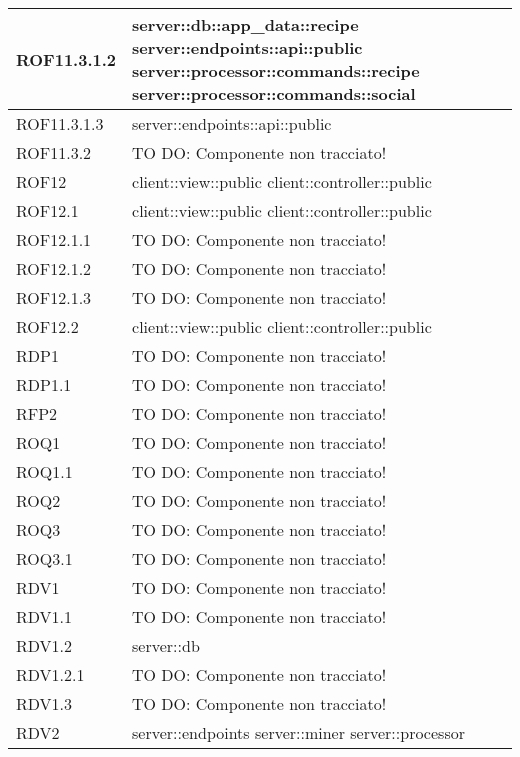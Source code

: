 \begin{center}
\begin{longtable}{| p{4cm} | p{8cm} |}
\hline
ROF11.3.1.2 & server::db::app\_data::recipe \newline server::endpoints::api::public \newline server::processor::commands::recipe \newline server::processor::commands::social \\
\hline
ROF11.3.1.3 & server::endpoints::api::public \\
\hline
ROF11.3.2 & TO DO: Componente non tracciato! \\
\hline
ROF12 & client::view::public \newline client::controller::public \\
\hline
ROF12.1 & client::view::public \newline client::controller::public \\
\hline
ROF12.1.1 & TO DO: Componente non tracciato! \\
\hline
ROF12.1.2 & TO DO: Componente non tracciato! \\
\hline
ROF12.1.3 & TO DO: Componente non tracciato! \\
\hline
ROF12.2 & client::view::public \newline client::controller::public \\
\hline
RDP1 & TO DO: Componente non tracciato! \\
\hline
RDP1.1 & TO DO: Componente non tracciato! \\
\hline
RFP2 & TO DO: Componente non tracciato! \\
\hline
ROQ1 & TO DO: Componente non tracciato! \\
\hline
ROQ1.1 & TO DO: Componente non tracciato! \\
\hline
ROQ2 & TO DO: Componente non tracciato! \\
\hline
ROQ3 & TO DO: Componente non tracciato! \\
\hline
ROQ3.1 & TO DO: Componente non tracciato! \\
\hline
RDV1 & TO DO: Componente non tracciato! \\
\hline
RDV1.1 & TO DO: Componente non tracciato! \\
\hline
RDV1.2 & server::db \\
\hline
RDV1.2.1 & TO DO: Componente non tracciato! \\
\hline
RDV1.3 & TO DO: Componente non tracciato! \\
\hline
RDV2 & server::endpoints \newline server::miner \newline server::processor \\

\end{longtable}
\end{center}
